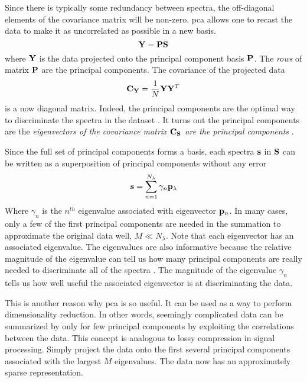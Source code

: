 Since there is typically some redundancy between spectra, the off-diagonal elements of the covariance matrix will be non-zero. \Gls{pca} allows one to recast the data to make it as uncorrelated as possible in a new basis. 
\begin{equation}
	\mathbf{Y} = \mathbf{PS}
\end{equation}
where $\mathbf{Y}$ is the data projected onto the principal component basis $\mathbf{P}$. The \emph{rows} of matrix $\mathbf{P}$ are the principal components.  The covariance of the projected data
\begin{equation}
	\mathbf{C_{Y}} = \frac{1}{N} \mathbf{Y} \mathbf{Y}^{T} 
\end{equation}
is a now diagonal matrix. Indeed, the principal components are the optimal way to discriminate the spectra in the dataset \cite{jolliffe2002principal}. It turns out the principal components are the \emph{eigenvectors of the covariance matrix $\mathbf{C}_{\mathbf{S}}$ are the principal components} \cite{shlens2014tutorial}. 

Since the full set of principal components forms a basis, each spectra $\mathbf{s}$ in $\mathbf{S}$ can be written as a superposition of principal components without any error
\begin{equation}
\mathbf{s} = \sum_{n = 1}^{N_{\lambda}} \gamma_{n} \mathbf{p}_{\lambda}
\end{equation}
Where $\gamma_{n}$ is the $n^{th}$ eigenvalue associated with eigenvector $\mathbf{p}_{n}$. In many cases, only a few of the first principal components are needed in the summation to approximate the original data well, $M \ll N_{\lambda} $. Note that each eigenvector has an associated eigenvalue. The eigenvalues are also informative because the relative magnitude of the eigenvalue can tell us how many principal components are really needed to discriminate all of the spectra \cite{poon2009image}. The magnitude of the eigenvalue $\gamma_{n}$ tells us how well useful the associated eigenvector is at discriminating the data.


This is another reason why \gls{pca} is so useful. It can be used as a way to perform dimensionality reduction. In other words, seemingly complicated data can be summarized by only for few principal components by exploiting the correlations between the data. This concept is analogous to lossy compression in signal processing. Simply project the data onto the first several principal components associated with the largest $M$ eigenvalues. The data now has an approximately sparse representation. 

